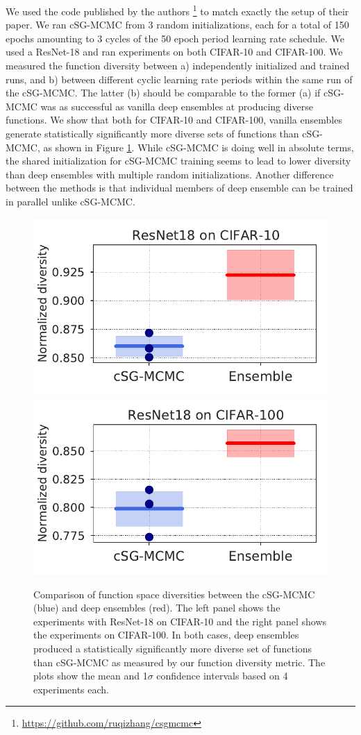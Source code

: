 \documentclass{article}
\newcommand{\reducespaceafterfigure}{\vspace{-1em}} %
\begin{document}
We used the code published by the authors \citet{Zhang2020Cyclical} \footnote{ \url{https://github.com/ruqizhang/csgmcmc}} to match exactly the setup of their paper. We ran cSG-MCMC from 3 random initializations, each for a total of 150 epochs amounting to 3 cycles of the 50 epoch period learning rate schedule. We used a ResNet-18 and ran experiments on both CIFAR-10 and CIFAR-100. We measured the function diversity between a) independently initialized and trained runs, and b) between different cyclic learning rate periods within the same run of the cSG-MCMC. The latter (b) should be comparable to the former (a) if cSG-MCMC was as successful as vanilla deep  ensembles at producing diverse functions. We show that both for CIFAR-10 and CIFAR-100, vanilla ensembles generate statistically significantly more diverse sets of functions than cSG-MCMC, as shown in Figure \ref{fig:cSGMCMC}. While cSG-MCMC is doing well in absolute terms, the shared initialization for cSG-MCMC training  seems to lead to lower diversity than deep ensembles with multiple random initializations.  
%
Another difference between the methods is that individual members of deep ensemble can be trained in parallel unlike cSG-MCMC. 
%

\begin{figure}[ht]
\begin{center}
  \includegraphics[width=0.45\linewidth]{figures/simplified_csgMCMC_diversityplot_cifar10_24228394.pdf}
  \includegraphics[width=0.45\linewidth]{figures/simplified_csgMCMC_diversityplot_cifar100_93162371.pdf}
  \label{fig:cSGMCMC}
  \reducespaceafterfigure
  \caption{Comparison of function space diversities between the cSG-MCMC (blue) and deep ensembles (red). The left panel shows the experiments with ResNet-18 on CIFAR-10 and the right panel shows the experiments on CIFAR-100. In both cases, deep ensembles produced a statistically significantly more diverse set of functions than cSG-MCMC as measured by our function diversity metric. The plots show the mean and 1$\sigma$ confidence intervals based on 4 experiments each.}
  \end{center}
\end{figure}
\end{document}
